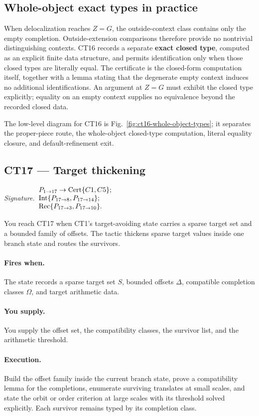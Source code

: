 \documentclass[
  11pt,
]{article}
\theoremstyle{definition}
\newcommand{\ctsignature}[1]{\par\noindent\emph{Signature.}\ #1\par\medskip}
\newcommand{\ctcert}[1]{\mathrm{Cert}\{#1\}}
\newcommand{\ctint}[1]{\mathrm{Int}\{#1\}}
\newcommand{\ctrec}[1]{\mathrm{Rec}\{#1\}}
\newcommand{\ctpar}[1]{\paragraph{#1.}}
\begin{document}
\subsection*{Whole-object exact types in practice}

When delocalization reaches \(Z=G\), the outside-context class contains
only the empty completion. Outside-extension comparisons therefore
provide no nontrivial distinguishing contexts. CT16 records a separate
\textbf{exact closed type}, computed as an explicit finite data structure,
and permits identification only when those closed types are literally
equal. The certificate is
the closed-form computation itself, together with a lemma stating that
the degenerate empty context induces no additional identifications. An
argument at \(Z=G\) must exhibit the closed type explicitly; equality on
an empty context supplies no equivalence beyond the recorded closed
data.

The low-level diagram for CT16 is Fig.~\ref{fig:ct16-whole-object-types};
it separates the proper-piece route, the whole-object closed-type
computation, literal equality closure, and default-refinement exit.



\subsection{CT17 --- Target thickening}\label{ct:17}\label{target-thickening-bounded-offsets-against-sparse-targets}
\ctsignature{\(\begin{array}{@{}l@{}}
P_{1\to17}\to \ctcert{C1,C5};\\
\ctint{P_{17\to8},P_{17\to14}};\\
\ctrec{P_{17\to3},P_{17\to10}}.
\end{array}\)}

You reach CT17 when CT1's target-avoiding state carries a sparse target
set and a bounded family of offsets.  The tactic thickens sparse target
values inside one branch state and routes the survivors.

\ctpar{Fires when}
The state records a sparse target set \(S\), bounded offsets \(\Delta\),
compatible completion classes \(\Omega\), and target arithmetic data.

\ctpar{You supply}
You supply the offset set, the compatibility classes, the survivor list,
and the arithmetic threshold.

\ctpar{Execution}
Build the offset family inside the current branch state, prove a
compatibility lemma for the completions, enumerate surviving translates
at small scales, and state the orbit or order criterion at
large scales with its threshold solved explicitly.  Each survivor remains
typed by its completion class.
\end{document}
